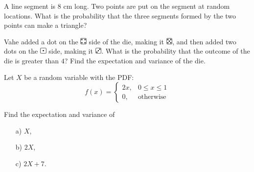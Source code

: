 \bigskip

\begin{problem}
    A line segment is $8$ cm long. Two points are put on the segment at
random locations. What is the probability that the three segments formed by
the two points can make a triangle?
\end{problem}


\bigskip

\begin{problem}
 Vahe added a dot on the   \includegraphics[height=0.9em]{figs/4.png} side of the die, making it \includegraphics[height=0.9em]{figs/5.png}, and then added two dots on the \includegraphics[height=0.9em]{figs/1.png} side, making it \includegraphics[height=0.9em]{figs/3.png}.
   What is the probability that the outcome of the die is greater than $4$? Find the expectation and variance of the die.
   
\end{problem}


\bigskip

\begin{problem}
   Let $X$ be a random variable with the PDF:
   \[
   f(x) = \begin{cases}
       2x, & 0 \le x \le 1 \\
       0, & \text{otherwise}
   \end{cases}
   \]

   Find the expectation and variance of
   \begin{enumerate}
       \item[a) ] $X$,
       \item[b) ] $2X$,
       \item[c) ] $2X + 7$. 
       
   \end{enumerate}
\end{problem}











